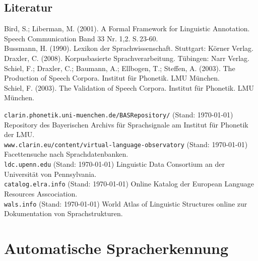 \documentclass[11pt]{book}
\begin{document}
\newpage

\section{Literatur}

Bird, S.; Liberman, M. (2001). A Formal Framework for Linguistic Annotation. Speech Communication Band 33 Nr. 1,2. S.\,23-60. \newline\\
Bussmann, H. (1990). Lexikon der Sprachwissenschaft. Stuttgart: Körner Verlag.\newline\\
Draxler, C. (2008). Korpusbasierte Sprachverarbeitung. Tübingen: Narr Verlag. \newline\\
Schiel, F.; Draxler, C.; Baumann, A.; Ellbogen, T.; Steffen, A. (2003). The Production of Speech Corpora. Institut für Phonetik. LMU München.\newline\\
Schiel, F. (2003). The Validation of Speech Corpora. Institut für Phonetik. LMU München.


\label{link_clarin_repository}
{\tt clarin.phonetik.uni-muenchen.de/BASRepository/} (Stand: \today) Repository des Bayerischen Archivs für Sprachsignale am Institut für Phonetik der LMU.\newline\\
{\tt www.clarin.eu/content/virtual-language-observatory} (Stand: \today) Facettensuche nach Sprachdatenbanken.\newline\\
{\tt ldc.upenn.edu} (Stand: \today) Linguistic Data Consortium an der Universität von Pennsylvania.\newline\\
{\tt catalog.elra.info} (Stand: \today) Online Katalog der European Language Resources Asscociation.\newline\\
{\tt wals.info} (Stand: \today) World Atlas of Linguistic Structures online zur Dokumentation von Sprachstrukturen.








\chapter{Automatische Spracherkennung}
\end{document}

